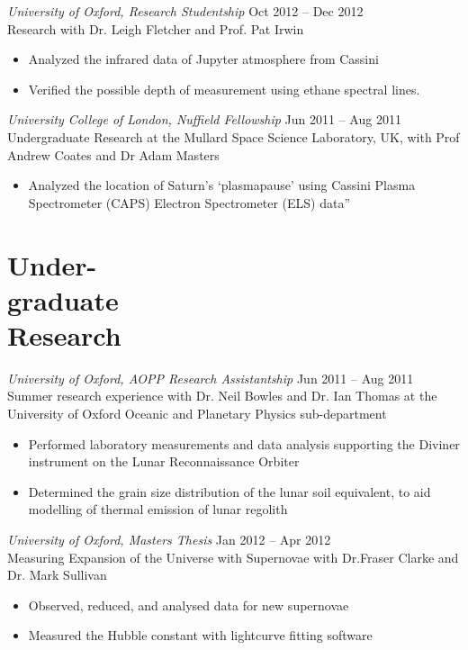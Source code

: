 \documentclass[margin]{res}
\begin{document}
\begin{resume}
{\sl University of Oxford, Research Studentship} \hfill Oct 2012 -- Dec 2012 \\ Research with Dr. Leigh Fletcher and Prof. Pat Irwin
\begin{itemize}
	\item Analyzed the infrared data of Jupyter atmosphere from Cassini 
	\item Verified the possible  depth of measurement using ethane spectral lines.
\end{itemize}

{\sl University College of London, Nuffield Fellowship} \hfill   Jun 2011 -- Aug 2011 \\
Undergraduate Research at the Mullard Space Science Laboratory, UK, with  Prof Andrew Coates and  Dr Adam Masters
\begin{itemize}%
\item Analyzed the location of Saturn’s ‘plasmapause’ using Cassini Plasma Spectrometer (CAPS) Electron Spectrometer (ELS) data” 
\end{itemize}





\section{Under-\\graduate\\Research} 
{\sl University of Oxford, AOPP Research Assistantship} \hfill            Jun 2011 -- Aug 2011 \\
Summer research experience with Dr. Neil Bowles and Dr. Ian Thomas  at the University of Oxford Oceanic and Planetary Physics sub-department
\begin{itemize}%
\item Performed laboratory measurements and data analysis supporting the Diviner instrument on the Lunar Reconnaissance Orbiter
\item Determined the grain size distribution of the lunar soil equivalent, to aid modelling of thermal emission of lunar regolith
\end{itemize}  



{\sl University of Oxford,  Masters Thesis} \hfill            Jan 2012 -- Apr 2012 \\
Measuring Expansion of the Universe with Supernovae with Dr.Fraser Clarke and Dr. Mark Sullivan
\begin{itemize}
\item Observed, reduced, and analysed data for new supernovae
\item Measured the Hubble constant with lightcurve fitting software 
\end{itemize} 



\end{resume}
\end{document}
